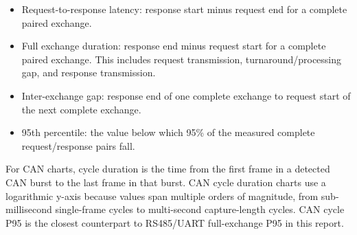 \documentclass[11pt,a4paper]{article}
\begin{document}
\begin{itemize}[leftmargin=*]
\item Request-to-response latency: response start minus request end for a
complete paired exchange.
\item Full exchange duration: response end minus request start for a complete
paired exchange. This includes request transmission, turnaround/processing gap,
and response transmission.
\item Inter-exchange gap: response end of one complete exchange to request start
of the next complete exchange.
\item 95th percentile: the value below which 95\% of the measured complete
request/response pairs fall.
\end{itemize}

For CAN charts, cycle duration is the time from the first frame in a detected
CAN burst to the last frame in that burst. CAN cycle duration charts use a
logarithmic y-axis because values span multiple orders of magnitude, from
sub-millisecond single-frame cycles to multi-second capture-length cycles. CAN
cycle P95 is the closest counterpart to RS485/UART full-exchange P95 in this
report.
\end{document}
